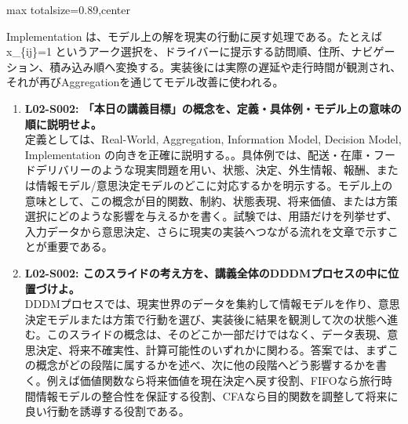 \begin{minipage}[t]{0.58\textwidth}
\begin{adjustbox}{max totalsize={\textwidth}{0.89\textheight},center}
\begin{minipage}{\textwidth}
Implementation は、モデル上の解を現実の行動に戻す処理である。たとえば x\_\{ij\}=1 というアーク選択を、ドライバーに提示する訪問順、住所、ナビゲーション、積み込み順へ変換する。実装後には実際の遅延や走行時間が観測され、それが再びAggregationを通じてモデル改善に使われる。\par{}\begin{enumerate}\item \textbf{L02-S002: 「本日の講義目標」の概念を、定義・具体例・モデル上の意味の順に説明せよ。}\\定義としては、Real-World, Aggregation, Information Model, Decision Model, Implementation の向きを正確に説明する。。具体例では、配送・在庫・フードデリバリーのような現実問題を用い、状態、決定、外生情報、報酬、または情報モデル/意思決定モデルのどこに対応するかを明示する。モデル上の意味として、この概念が目的関数、制約、状態表現、将来価値、または方策選択にどのような影響を与えるかを書く。試験では、用語だけを列挙せず、入力データから意思決定、さらに現実の実装へつながる流れを文章で示すことが重要である。\item \textbf{L02-S002: このスライドの考え方を、講義全体のDDDMプロセスの中に位置づけよ。}\\DDDMプロセスでは、現実世界のデータを集約して情報モデルを作り、意思決定モデルまたは方策で行動を選び、実装後に結果を観測して次の状態へ進む。このスライドの概念は、そのどこか一部だけではなく、データ表現、意思決定、将来不確実性、計算可能性のいずれかに関わる。答案では、まずこの概念がどの段階に属するかを述べ、次に他の段階へどう影響するかを書く。例えば価値関数なら将来価値を現在決定へ戻す役割、FIFOなら旅行時間情報モデルの整合性を保証する役割、CFAなら目的関数を調整して将来に良い行動を誘導する役割である。\end{enumerate}
\end{minipage}
\end{adjustbox}
\end{minipage}


